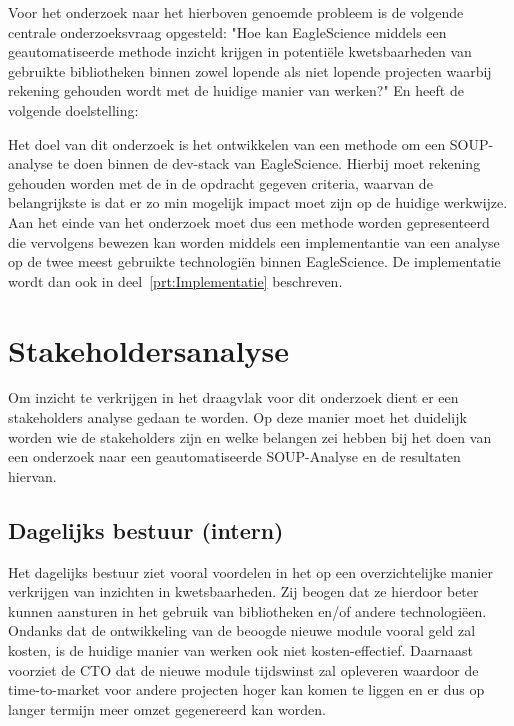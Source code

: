 Voor het onderzoek naar het hierboven genoemde probleem is de volgende centrale onderzoeksvraag opgesteld: "Hoe kan EagleScience middels een geautomatiseerde methode inzicht krijgen in potentiële kwetsbaarheden van gebruikte bibliotheken binnen zowel lopende als niet lopende projecten waarbij rekening gehouden wordt met de huidige manier van werken?" En heeft de volgende doelstelling:




Het doel van dit onderzoek is het ontwikkelen van een methode om een SOUP-analyse te doen binnen de dev-stack van EagleScience. Hierbij moet rekening gehouden worden met de in de opdracht gegeven criteria, waarvan de belangrijkste is dat er zo min mogelijk impact moet zijn op de huidige werkwijze. Aan het einde van het onderzoek moet dus een methode worden gepresenteerd die vervolgens bewezen kan worden middels een implementantie van een  analyse op de twee meest gebruikte technologiën binnen EagleScience. De implementatie wordt dan ook in deel~\ref{prt:Implementatie} beschreven.


\section{Stakeholdersanalyse}\label{sec:stakeholdersanalyse}
Om inzicht te verkrijgen in het draagvlak voor dit onderzoek dient er een stakeholders analyse gedaan te worden. Op deze manier moet het duidelijk worden wie de stakeholders zijn en welke belangen zei hebben bij het doen van een onderzoek naar een geautomatiseerde SOUP-Analyse en de resultaten hiervan.

\subsection{Dagelijks bestuur (intern)}\label{subsec:dagelijks-bestuur-(intern)1}
Het dagelijks bestuur ziet vooral voordelen in het op een overzichtelijke manier verkrijgen van inzichten in kwetsbaarheden. Zij beogen dat ze hierdoor beter kunnen aansturen in het gebruik van bibliotheken en/of andere technologiëen. Ondanks dat de ontwikkeling van de beoogde nieuwe module vooral geld zal kosten, is de huidige manier van werken ook niet kosten-effectief. Daarnaast voorziet de CTO dat de nieuwe module tijdswinst zal opleveren waardoor de time-to-market voor andere projecten hoger kan komen te liggen en er dus op langer termijn meer omzet gegenereerd kan worden.

